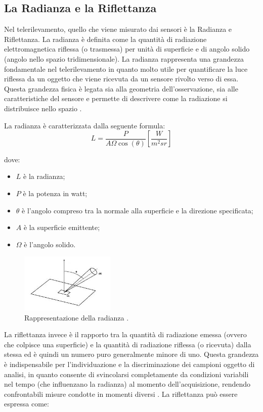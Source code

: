 \newpage
\subsection{La Radianza e la Riflettanza}
Nel telerilevamento, quello che viene misurato dai sensori è la Radianza e Riflettanza. 
La radianza è definita come la quantità di radiazione elettromagnetica riflessa 
(o trasmessa) per unità di superficie e di angolo solido (angolo nello spazio 
tridimensionale). La radianza rappresenta una grandezza fondamentale nel 
telerilevamento in quanto molto utile per quantificare la luce riflessa da un 
oggetto che viene ricevuta da un sensore rivolto verso di essa. Questa grandezza 
fisica è legata sia alla geometria dell’osservazione, sia alle caratteristiche del 
sensore e permette di descrivere come la radiazione si distribuisce nello spazio
\cite{Radianza, ALL6_REMOTE_SENSING}. 

La radianza è caratterizzata dalla seguente formula: 
\begin{equation}
    L = \frac{P}{A \Omega \cos ({\theta})} \left[\frac{W}{m^2sr}\right]
\end{equation}

dove:
\begin{itemize}
    \item $L$ è la radianza;
    \item $P$ è la potenza in watt;
    \item $\theta$ è l'angolo compreso tra la normale alla superficie e la direzione specificata;
    \item $A$ è la superficie emittente;
    \item $\Omega$ è l'angolo solido.
\end{itemize}

\begin{figure}[H]
    \centering
    \includegraphics[width=0.40\textwidth]{Immagini/Grafici/radianza.png}
    \caption{Rappresentazione della radianza \cite{RADIANZA_IMG}.}
    \label{fig:Radianza}
\end{figure}

La riflettanza invece è il rapporto tra la quantità di radiazione emessa (ovvero 
che colpisce una superficie) e la quantità di radiazione riflessa (o ricevuta) dalla stessa 
ed è quindi un numero puro generalmente minore di uno. 
Questa grandezza è indispensabile per l’individuazione e la discriminazione dei 
campioni oggetto di analisi, in quanto consente di svincolarsi completamente da 
condizioni variabili nel tempo (che influenzano la radianza) al momento 
dell’acquisizione, rendendo confrontabili misure condotte in momenti diversi
\cite{Riflettanza, ALL6_REMOTE_SENSING}. 
La riflettanza può essere espressa come: 

